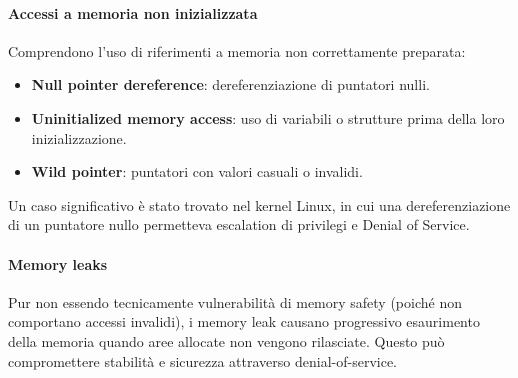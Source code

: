 \paragraph{Accessi a memoria non inizializzata}
\label{sec:initialization}

Comprendono l'uso di riferimenti a memoria non correttamente preparata:
\begin{itemize}
  \item \textbf{Null pointer dereference}: dereferenziazione di puntatori nulli.

  \item \textbf{Uninitialized memory access}: uso di variabili o strutture prima
    della loro inizializzazione.

  \item \textbf{Wild pointer}: puntatori con valori casuali o invalidi.
\end{itemize}
Un caso significativo è stato trovato nel kernel Linux\cite{null_pointer_dereference_linux},
in cui una dereferenziazione di un puntatore nullo permetteva escalation di privilegi
e Denial of Service.

\paragraph{Memory leaks}
\label{sec:memory_leaks} Pur non essendo tecnicamente vulnerabilità di memory
safety (poiché non comportano accessi invalidi), i memory leak causano progressivo
esaurimento della memoria quando aree allocate non vengono rilasciate. Questo
può compromettere stabilità e sicurezza attraverso denial-of-service.